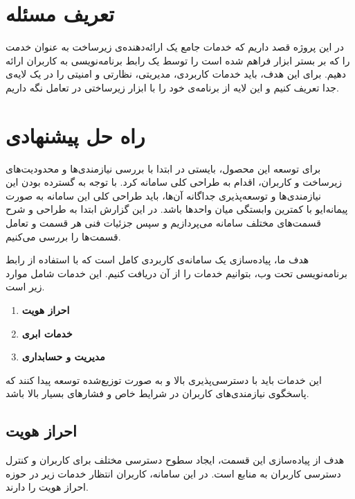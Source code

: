 \section{تعریف مسئله}
در این پروژه قصد داریم که خدمات جامع یک ارائه‌دهنده‌ی زیرساخت به عنوان خدمت را که بر بستر ابزار  فراهم شده است را توسط یک رابط برنامه‌نویسی به کاربران ارائه دهیم. برای این هدف، باید خدمات کاربردی، مدیریتی، نظارتی و امنیتی را در یک لایه‌ی جدا تعریف کنیم و این لایه از برنامه‌ی خود را با ابزار زیرساختی در تعامل نگه داریم. 
\section{راه حل پیشنهادی}
برای توسعه این محصول، بایستی در ابتدا با بررسی نیازمندی‌ها و محدودیت‌های زیرساخت و کاربران، اقدام به طراحی کلی سامانه کرد. با توجه به گسترده بودن این نیازمندی‌ها و توسعه‌پذیری جداگانه آن‌ها، باید طراحی کلی این سامانه به صورت پیمانه‌ایو با کمترین وابستگی میان واحد‌ها باشد. در این گزارش ابتدا به طراحی و شرح قسمت‌های مختلف سامانه می‌پردازیم و سپس جزئیات فنی هر قسمت و تعامل قسمت‌ها را بررسی می‌کنیم.


هدف ما، پیاده‌سازی یک سامانه‌ی کاربردی کامل است که با استفاده از رابط برنامه‌نویسی تحت وب، بتوانیم خدمات را از آن دریافت کنیم. این خدمات شامل موارد زیر است.

\begin{enumerate}
	\item \textbf{احراز هویت}
	
	\item \textbf{خدمات ابری}
	
	\item \textbf{مدیریت و حسابداری}
\end{enumerate}

این خدمات باید با دسترسی‌پذیری بالا و به صورت توزیع‌شده توسعه پیدا کنند که پاسخگوی نیازمندی‌های کاربران در شرایط خاص و فشار‌های بسیار بالا باشد.

\subsection{احراز هویت}
هدف از پیاده‌سازی این قسمت، ایجاد سطوح دسترسی مختلف برای کاربران و کنترل دسترسی کاربران به منابع است. در این سامانه، کاربران انتظار خدمات زیر در حوزه احراز هویت را دارند.

